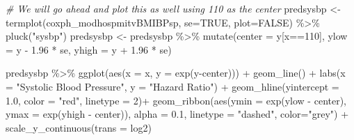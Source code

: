 \documentclass[
]{book}
\newenvironment{Shaded}{\begin{snugshade}}{\end{snugshade}}
\newcommand{\AttributeTok}[1]{\textcolor[rgb]{0.77,0.63,0.00}{#1}}
\newcommand{\CommentTok}[1]{\textcolor[rgb]{0.56,0.35,0.01}{\textit{#1}}}
\newcommand{\ConstantTok}[1]{\textcolor[rgb]{0.00,0.00,0.00}{#1}}
\newcommand{\DecValTok}[1]{\textcolor[rgb]{0.00,0.00,0.81}{#1}}
\newcommand{\FloatTok}[1]{\textcolor[rgb]{0.00,0.00,0.81}{#1}}
\newcommand{\FunctionTok}[1]{\textcolor[rgb]{0.00,0.00,0.00}{#1}}
\newcommand{\NormalTok}[1]{#1}
\newcommand{\OtherTok}[1]{\textcolor[rgb]{0.56,0.35,0.01}{#1}}
\newcommand{\SpecialCharTok}[1]{\textcolor[rgb]{0.00,0.00,0.00}{#1}}
\newcommand{\StringTok}[1]{\textcolor[rgb]{0.31,0.60,0.02}{#1}}
\begin{document}
\begin{Shaded}
\begin{Highlighting}[]
\CommentTok{\# We will go ahead and plot this as well using 110 as the center}
\NormalTok{predsysbp }\OtherTok{\textless{}{-}} \FunctionTok{termplot}\NormalTok{(coxph\_modhospmitvBMIBPsp, }\AttributeTok{se=}\ConstantTok{TRUE}\NormalTok{, }\AttributeTok{plot=}\ConstantTok{FALSE}\NormalTok{) }\SpecialCharTok{\%\textgreater{}\%} 
  \FunctionTok{pluck}\NormalTok{(}\StringTok{"sysbp"}\NormalTok{)}
\NormalTok{predsysbp }\OtherTok{\textless{}{-}}\NormalTok{ predsysbp }\SpecialCharTok{\%\textgreater{}\%}  
  \FunctionTok{mutate}\NormalTok{(}\AttributeTok{center =}\NormalTok{ y[x}\SpecialCharTok{==}\DecValTok{110}\NormalTok{],}
         \AttributeTok{ylow =}\NormalTok{ y }\SpecialCharTok{{-}} \FloatTok{1.96} \SpecialCharTok{*}\NormalTok{ se,}
         \AttributeTok{yhigh =}\NormalTok{ y }\SpecialCharTok{+} \FloatTok{1.96} \SpecialCharTok{*}\NormalTok{ se)}

\NormalTok{predsysbp }\SpecialCharTok{\%\textgreater{}\%}
  \FunctionTok{ggplot}\NormalTok{(}\FunctionTok{aes}\NormalTok{(}\AttributeTok{x =}\NormalTok{ x, }\AttributeTok{y =} \FunctionTok{exp}\NormalTok{(y}\SpecialCharTok{{-}}\NormalTok{center))) }\SpecialCharTok{+} 
  \FunctionTok{geom\_line}\NormalTok{() }\SpecialCharTok{+}
  \FunctionTok{labs}\NormalTok{(}\AttributeTok{x =} \StringTok{"Systolic Blood Pressure"}\NormalTok{, }
       \AttributeTok{y =} \StringTok{"Hazard Ratio"}\NormalTok{) }\SpecialCharTok{+} 
  \FunctionTok{geom\_hline}\NormalTok{(}\AttributeTok{yintercept =} \FloatTok{1.0}\NormalTok{, }\AttributeTok{color =} \StringTok{"red"}\NormalTok{, }\AttributeTok{linetype =} \DecValTok{2}\NormalTok{)}\SpecialCharTok{+}
  \FunctionTok{geom\_ribbon}\NormalTok{(}\FunctionTok{aes}\NormalTok{(}\AttributeTok{ymin =} \FunctionTok{exp}\NormalTok{(ylow }\SpecialCharTok{{-}}\NormalTok{ center), }\AttributeTok{ymax =} \FunctionTok{exp}\NormalTok{(yhigh }\SpecialCharTok{{-}}\NormalTok{ center)), }
              \AttributeTok{alpha =} \FloatTok{0.1}\NormalTok{, }
              \AttributeTok{linetype =} \StringTok{"dashed"}\NormalTok{,}
              \AttributeTok{color=}\StringTok{"grey"}\NormalTok{) }\SpecialCharTok{+}
  \FunctionTok{scale\_y\_continuous}\NormalTok{(}\AttributeTok{trans =} \StringTok{\textquotesingle{}log2\textquotesingle{}}\NormalTok{)}
\end{Highlighting}
\end{Shaded}
\end{document}
